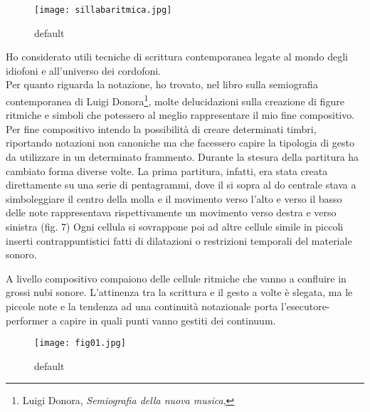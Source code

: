 
\begin{figure}[htbp]
\begin{center}
\texttt{[image: sillabaritmica.jpg]}
\caption{default}
\label{default}
\end{center}
\end{figure}

Ho considerato utili tecniche di scrittura contemporanea legate al mondo degli idiofoni e all'universo dei cordofoni. \\
Per quanto riguarda la notazione, ho trovato, nel libro sulla semiografia contemporanea di Luigi Donora\footnote{Luigi Donora, \textit{Semiografia della nuova musica}, }, molte delucidazioni sulla creazione di figure ritmiche e simboli che potessero al meglio rappresentare il mio fine compositivo. Per fine compositivo intendo la possibilità di creare determinati timbri, riportando notazioni non canoniche ma che facessero capire la tipologia di gesto da utilizzare in un determinato frammento. Durante la stesura della partitura ha cambiato forma diverse volte. La prima partitura, infatti, era stata creata direttamente su una serie di pentagrammi, dove il si sopra al do centrale stava a simboleggiare il centro della molla e il movimento verso l'alto e verso il basso delle note rappresentava rispettivamente un movimento verso destra e verso sinistra (fig. 7)
Ogni cellula si sovrappone poi ad altre cellule simile in piccoli inserti contrappuntistici fatti di dilatazioni o restrizioni temporali del materiale sonoro.

A livello compositivo compaiono delle cellule ritmiche che vanno a confluire in grossi nubi sonore. L'attinenza tra la scrittura e il gesto a volte è slegata, ma le piccole note e la tendenza ad una continuità notazionale porta l'esecutore-performer a capire in quali punti vanno gestiti dei continuum.


\begin{wrapfigure}{r}{5cm}
\centering
\texttt{[image: fig01.jpg]}
\caption{default}
\label{default}
\end{wrapfigure}

